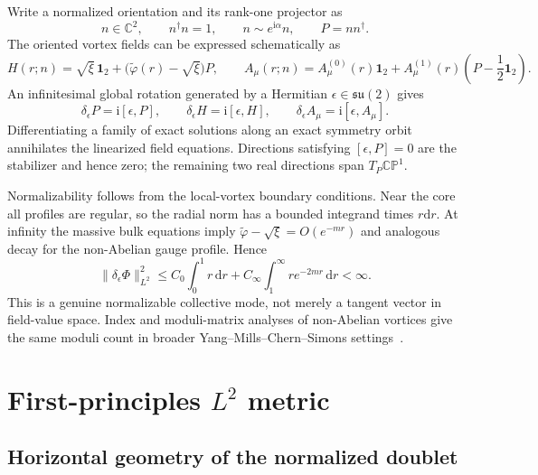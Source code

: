 \documentclass[11pt]{article}
\theoremstyle{definition}
\theoremstyle{remark}
\newcommand{\ii}{\mathrm i}
\newcommand{\dd}{\mathrm d}
\newcommand{\CC}{\mathbb C}
\newcommand{\CP}{\mathbb {CP}}
\begin{document}
Write a normalized orientation and its rank-one projector as
\begin{equation}
 n\in\CC^2,\qquad n^\dagger n=1,\qquad
 n\sim e^{\ii\alpha}n,\qquad P=nn^\dagger.
 \label{eq:n-projector}
\end{equation}
The oriented vortex fields can be expressed schematically as
\begin{equation}
 H(r;n)=\sqrt\xi\,\bm1_2+
 \bigl(\widetilde\varphi(r)-\sqrt\xi\bigr)P,
 \qquad
 A_\mu(r;n)=A_\mu^{(0)}(r)\bm1_2+A_\mu^{(1)}(r)
 \left(P-\frac12\bm1_2\right).
 \label{eq:oriented-fields}
\end{equation}
An infinitesimal global rotation generated by a Hermitian
\(\epsilon\in\mathfrak{su}(2)\) gives
\begin{equation}
 \delta_\epsilon P=\ii[\epsilon,P],\qquad
 \delta_\epsilon H=\ii[\epsilon,H],\qquad
 \delta_\epsilon A_\mu=\ii[\epsilon,A_\mu].
 \label{eq:symmetry-zero-mode}
\end{equation}
Differentiating a family of exact solutions along an exact symmetry orbit
annihilates the linearized field equations.  Directions satisfying
\([\epsilon,P]=0\) are the stabilizer and hence zero; the remaining two real
directions span \(T_P\CP^1\).

Normalizability follows from the local-vortex boundary conditions.  Near
the core all profiles are regular, so the radial norm has a bounded
integrand times \(r\dd r\).  At infinity the massive bulk equations imply
\(\widetilde\varphi-\sqrt\xi=O(e^{-mr})\) and analogous decay for the
non-Abelian gauge profile.  Hence
\begin{equation}
 \|\delta_\epsilon\Phi\|_{L^2}^2
 \leq C_0\int_0^1r\,\dd r+
 C_\infty\int_1^\infty r e^{-2mr}\,\dd r<\infty.
 \label{eq:normalizable}
\end{equation}
This is a genuine normalizable collective mode, not merely a tangent vector
in field-value space.  Index and moduli-matrix analyses of non-Abelian
vortices give the same moduli count in broader Yang--Mills--Chern--Simons
settings~\cite{GudnasonEto2021APE4SQM}.

\section{First-principles \texorpdfstring{\(L^2\)}{L2} metric}

\subsection{Horizontal geometry of the normalized doublet}
\end{document}
